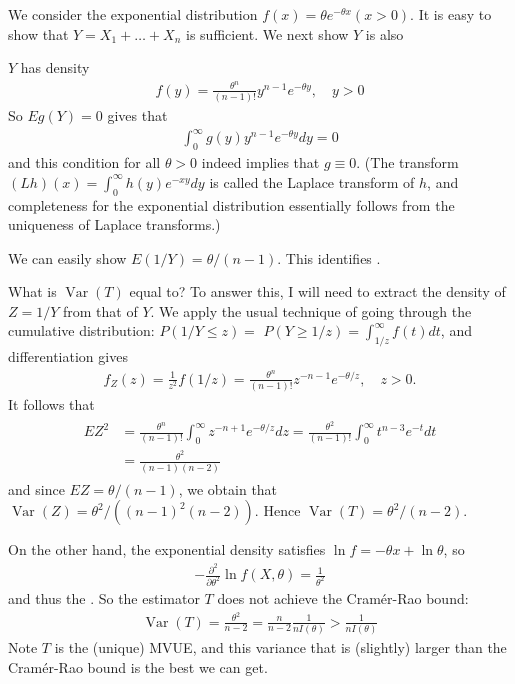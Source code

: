 \documentclass{article}
\begin{document}
\begin{exma}\label{ex:exp_comp}
  We consider the exponential distribution $f(x)=\theta e^{-\theta x}(x>0) .$ It is easy to show that $Y=X_{1}+\ldots+X_{n}$ is sufficient. We next show  $Y$ is also 
  
  $Y$ has density
\begin{align*}
f(y)=\frac{\theta^{n}}{(n-1) !} y^{n-1} e^{-\theta y}, \quad y>0
\end{align*}
So $E g(Y)=0$ gives that
\begin{align*}
\int_{0}^{\infty} g(y) y^{n-1} e^{-\theta y} d y=0
\end{align*}
and this condition for all $\theta>0$ indeed implies that $g \equiv 0$. (The transform $(L h)(x)=\int_{0}^{\infty} h(y) e^{-x y} d y$ is called the Laplace transform of $h$,
and completeness for the exponential distribution essentially follows from the uniqueness of Laplace transforms.)

We can easily show $E(1 / Y)=\theta /(n-1)$. This identifies .

What is $\operatorname{Var}(T)$ equal to? To answer this, I will need to extract the density of $Z=1 / Y$ from that of $Y$. We apply the usual technique of going through the cumulative distribution: $P(1 / Y \leq z)=$ $P(Y \geq 1 / z)=\int_{1 / z}^{\infty} f(t) d t$, and differentiation gives
\begin{align*}
f_{Z}(z)=\frac{1}{z^{2}} f(1 / z)=\frac{\theta^{n}}{(n-1) !} z^{-n-1} e^{-\theta / z}, \quad z>0 .
\end{align*}
It follows that
\begin{align*}
\begin{aligned}
E Z^{2} &=\frac{\theta^{n}}{(n-1) !} \int_{0}^{\infty} z^{-n+1} e^{-\theta / z} d z=\frac{\theta^{2}}{(n-1) !} \int_{0}^{\infty} t^{n-3} e^{-t} d t \\
&=\frac{\theta^{2}}{(n-1)(n-2)}
\end{aligned}
\end{align*}
and since $E Z=\theta /(n-1)$, we obtain that $\operatorname{Var}(Z)=\theta^{2} /\left((n-1)^{2}(n-2)\right)$. Hence $\operatorname{Var}(T)=\theta^{2} /(n-2)$.

On the other hand, the exponential density satisfies $\ln f=-\theta x+\ln \theta$, so
\begin{align*}
-\frac{\partial^{2}}{\partial \theta^{2}} \ln f(X, \theta)=\frac{1}{\theta^{2}}
\end{align*}
and thus the . So the estimator $T$ does not achieve the Cram\'er-Rao bound:
\begin{align*}
\operatorname{Var}(T)=\frac{\theta^{2}}{n-2}=\frac{n}{n-2} \frac{1}{n I(\theta)}>\frac{1}{n I(\theta)}
\end{align*}
Note $T$ is the (unique) MVUE,  and this variance that is (slightly) larger than the Cram\'er-Rao bound is the best we can get.
\end{exma}
\end{document}
